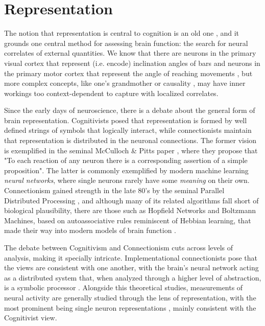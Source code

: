         
\section{Representation}
\label{sec:representation}
    The notion that representation is central to cognition is an old one \cite[p.~134-140]{rosch1991embodied}, and it grounds one central method for assessing brain function: the search for neural correlates of external quantities. We know that there are neurons in the primary visual cortex that represent (i.e. encode) inclination angles of bars \cite[p.~13]{dayan2001theoretical} and neurons in the primary motor cortex that represent the angle of reaching movements \cite[p.~14]{dayan2001theoretical}, but more complex concepts, like one's grandmother \cite{} or causality \cite{}, may have inner workings too context-dependent to capture with localized correlates. 
    
    Since the early days of neuroscience, there is a debate about the general form of brain representation. Cognitivists posed that representation is formed by well defined strings of symbols that logically interact, while connectionists maintain that representation is distributed in the neuronal connections. The former vision is exemplified in the seminal McCulloch \& Pitts paper \cite{mcculloch1943logical}, where they propose that "To each reaction of any neuron there is a corresponding assertion of a simple proposition". The latter is commonly exemplified by modern machine learning \textit{neural networks}, where single neurons rarely have some \textit{meaning} on their own. Connectionism gained strength in the late 80's by the seminal Parallel Distributed Processing \cite{mcclelland1986parallel}, and although many of its related algorithms fall short of biological plausibility, there are those such as Hopfield Networks and Boltzmann Machines, based on autoassociative rules reminiscent of Hebbian learning, that made their way into modern models of brain function \cite{}. 
    
    The debate between Cognitivism and Connectionism cuts across levels of analysis, making it specially intricate. Implementational connectionists pose that the views are consistent with one another, with the brain's neural network acting as a distributed system that, when analyzed through a higher level of abstraction, is a symbolic processor \cite{}. Alongside this theoretical studies, measurements of neural activity are generally studied through the lens of representation, with the most prominent being single neuron representations \cite{}, mainly consistent with the Cognitivist view.
    

